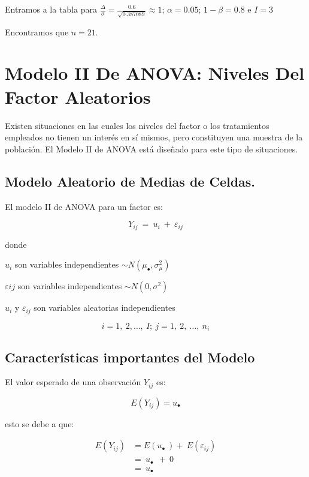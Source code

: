 \documentclass[]{book}
\theoremstyle{definition}
\theoremstyle{definition}
\theoremstyle{definition}
\theoremstyle{remark}
\begin{document}
Entramos a la tabla para
\(\frac{\Delta}{\sigma} = \frac{0.6}{\sqrt{0.387089}} \approx 1\);
\(\alpha = 0.05\); \(1 - \beta = 0.8\) e \(I = 3\)

Encontramos que \(n = 21\).

\hypertarget{modelo-ii-de-anova-niveles-del-factor-aleatorios}{%
\section{Modelo II De ANOVA: Niveles Del Factor
Aleatorios}\label{modelo-ii-de-anova-niveles-del-factor-aleatorios}}

Existen situaciones en las cuales los niveles del factor o los
tratamientos empleados no tienen un interés en sí mismos, pero
constituyen una muestra de la población. El Modelo II de ANOVA está
diseñado para este tipo de situaciones.

\hypertarget{modelo-aleatorio-de-medias-de-celdas.}{%
\subsection{Modelo Aleatorio de Medias de
Celdas.}\label{modelo-aleatorio-de-medias-de-celdas.}}

El modelo II de ANOVA para un factor es:

\[
Y_{ij}\  = \ u_{i}\  + \ \varepsilon_{ij}
\]

donde

\(u_{i}\) son variables independientes
\(\sim N\left( \mu_{\bullet},\sigma_{\mu}^{2} \right)\)

\(\varepsilon{ij}\) son variables independientes
\(\sim N\left( 0,\sigma^{2} \right)\)

\(u_{i}\) y \(\varepsilon_{ij}\) son variables aleatorias independientes

\[
i = 1,\ 2,\ldots,\ I;\ j = 1,\ 2,\ \ldots,\ n_{i}
\]

\hypertarget{caracteristicas-importantes-del-modelo-1}{%
\subsection{Características importantes del
Modelo}\label{caracteristicas-importantes-del-modelo-1}}

El valor esperado de una observación \(Y_{ij}\) es:

\[
E(Y_{ij}) = u_{\bullet}
\]

esto se debe a que:

\[
\begin{aligned}
E\left( Y_{ij} \right)& = E\left( u_{\bullet}\  \right) + \ E\left( \varepsilon_{ij} \right) \\
& = \ u_{\bullet}\ \  + \ 0 \\
& = \ u_{\bullet} \\
\end{aligned}
\]
\end{document}
